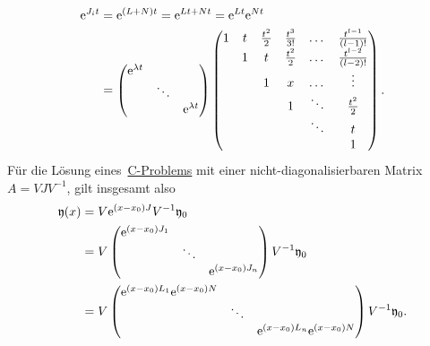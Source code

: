 \begin{align*}
    \mathrm{e}^{J_i t} &= \mathrm{e}^{(L + N) t} = \mathrm{e}^{Lt + Nt} = \mathrm{e}^{Lt} \mathrm{e}^{Nt}\\
    &= \begin{pmatrix}
           \mathrm{e}^{\lambda t} &        & \\
                          & \ddots & \\
                          &        & \mathrm{e}^{\lambda t}
        \end{pmatrix}
        \begin{pmatrix}
            1 & t & \frac{t^2}{2} & \frac{t^3}{3!} & \dots  & \frac{t^{l-1}}{(l-1)!}\\
              & 1 & t             & \frac{t^2}{2}  & \dots  & \frac{t^{l-2}}{(l-2)!}\\
              &   & 1             & x              & \dots  & \vdots\\
              &   &               & 1              & \ddots & \frac{t^2}{2}\\
              &   &               &                & \ddots & t\\
              &   &               &                &        & 1
        \end{pmatrix}.
\end{align*}
Für die Lösung eines~\hyperref[eq:cp]{C-Problems} mit einer nicht-diagonalisierbaren Matrix $A = V J V^{-1}$,
gilt insgesamt also
\begin{align*}
    \mathfrak{y}(x) &= V \mathrm{e}^{(x - x_0) J} V^{-1} \mathfrak{y}_0\\
    &= V \begin{pmatrix}
            \mathrm{e}^{(x - x_0) J_1} &        & \\
                               & \ddots & \\
                               &        & \mathrm{e}^{(x - x_0) J_n}
        \end{pmatrix} V^{-1} \mathfrak{y}_0\\
    &= V \begin{pmatrix}
            \mathrm{e}^{(x - x_0) L_1} \mathrm{e}^{(x - x_0) N} &        & \\
                                                & \ddots & \\
                                                &        & \mathrm{e}^{(x - x_0) L_n} \mathrm{e}^{(x - x_0) N}
        \end{pmatrix} V^{-1} \mathfrak{y}_0.
\end{align*}